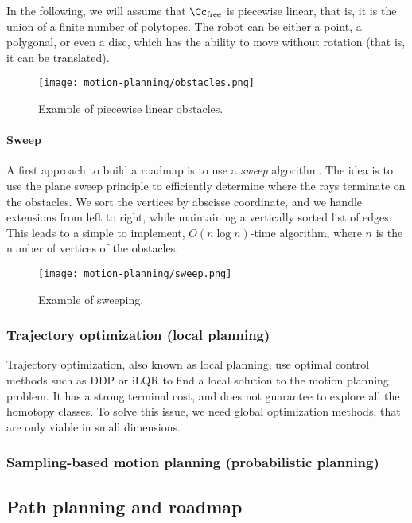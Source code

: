 In the following, we will assume that $\Cc_{\text{free}}$ is piecewise linear, that is, it is the union of a finite number of polytopes. The robot can be either a point, a polygonal, or even a disc, which has the ability to move without rotation (that is, it can be translated).
\begin{figure}[H]
    \centering
    \texttt{[image: motion-planning/obstacles.png]}
    \caption{Example of piecewise linear obstacles.}
\end{figure}

\paragraph*{Sweep}
A first approach to build a roadmap is to use a \emph{sweep} algorithm. The idea is to use the plane sweep principle to efficiently determine where the rays terminate on the obstacles. We sort the vertices by abscisse coordinate, and we handle extensions from left to right, while maintaining a vertically sorted list of edges. This leads to a simple to implement, $O(n\log n)$-time algorithm, where $n$ is the number of vertices of the obstacles.
\begin{figure}[H]
    \centering
    \texttt{[image: motion-planning/sweep.png]}
    \caption{Example of sweeping.}
\end{figure}

\subsubsection{Trajectory optimization (local planning)}
Trajectory optimization, also known as local planning, use optimal control methods such as DDP or iLQR to find a local solution to the motion planning problem. It has a strong terminal cost, and does not guarantee to explore all the homotopy classes. To solve this issue, we need global optimization methods, that are only viable in small dimensions. 

\subsubsection{Sampling-based motion planning (probabilistic planning)}

\subsection{Path planning and roadmap}

\newpage